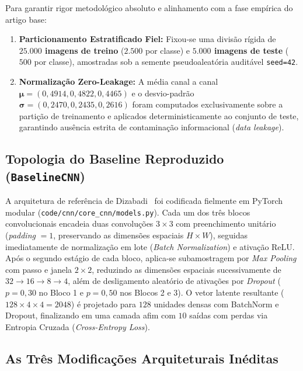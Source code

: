 \documentclass[runningheads]{llncs}
\begin{document}
Para garantir rigor metodol\'{o}gico absoluto e alinhamento com a fase emp\'{i}rica do artigo base:
\begin{enumerate}
    \item \textbf{Particionamento Estratificado Fiel:} Fixou-se uma divis\~{a}o r\'{i}gida de \textbf{$25.000$ imagens de treino} ($2.500$ por classe) e \textbf{$5.000$ imagens de teste} ($500$ por classe), amostradas sob a semente pseudoaleat\'{o}ria audit\'{a}vel \texttt{seed=42}.
    \item \textbf{Normaliza\c{c}\~{a}o Zero-Leakage:} A m\'{e}dia canal a canal $\boldsymbol{\mu} = (0{,}4914, 0{,}4822, 0{,}4465)$ e o desvio-padr\~{a}o $\boldsymbol{\sigma} = (0{,}2470, 0{,}2435, 0{,}2616)$ foram computados exclusivamente sobre a parti\c{c}\~{a}o de treinamento e aplicados deterministicamente ao conjunto de teste, garantindo aus\^{e}ncia estrita de contamina\c{c}\~{a}o informacional (\textit{data leakage}).
\end{enumerate}

\subsection{Topologia do Baseline Reproduzido (\texttt{BaselineCNN})}
A arquitetura de refer\^{e}ncia de Dizabadi~\cite{dizabadi2026empirical} foi codificada fielmente em PyTorch modular (\texttt{code/cnn/core\_cnn/models.py}). Cada um dos tr\^{e}s blocos convolucionais encadeia duas convolu\c{c}\~{o}es $3 \times 3$ com preenchimento unit\'{a}rio (\textit{padding} $= 1$, preservando as dimens\~{o}es espaciais $H \times W$), seguidas imediatamente de normaliza\c{c}\~{a}o em lote (\textit{Batch Normalization}) e ativa\c{c}\~{a}o ReLU. Ap\'{o}s o segundo est\'{a}gio de cada bloco, aplica-se subamostragem por \textit{Max Pooling} com passo e janela $2 \times 2$, reduzindo as dimens\~{o}es espaciais sucessivamente de $32 \to 16 \to 8 \to 4$, al\'{e}m de desligamento aleat\'{o}rio de ativa\c{c}\~{o}es por \textit{Dropout} ($p=0{,}30$ no Bloco 1 e $p=0{,}50$ nos Blocos 2 e 3). O vetor latente resultante ($128 \times 4 \times 4 = 2048$) \'{e} projetado para $128$ unidades densas com BatchNorm e Dropout, finalizando em uma camada afim com $10$ sa\'{i}das com perdas via Entropia Cruzada (\textit{Cross-Entropy Loss}).

\subsection{As Tr\^{e}s Modifica\c{c}\~{o}es Arquiteturais In\'{e}ditas}
\end{document}
